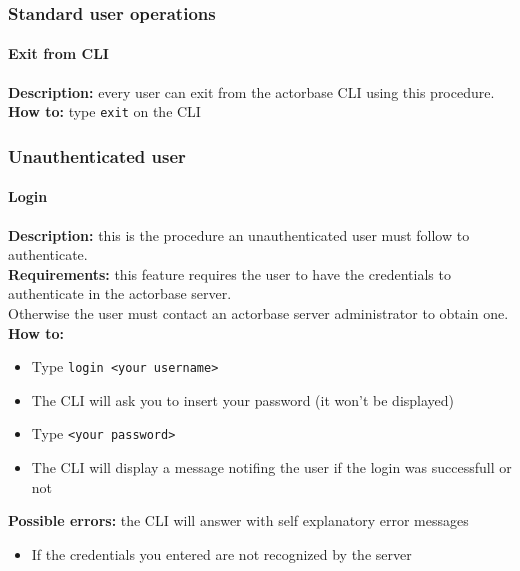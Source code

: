 \documentclass{scalatekids-article}
\begin{document}
\subsubsection{Standard user operations}
\label{sec:everyuser}
\paragraph{Exit from CLI}

\textbf{Description:} every user can exit from the actorbase CLI 
using this procedure.\\
\textbf{How to:} type \texttt{exit} on the CLI

\subsubsection{Unauthenticated user}
\label{sec:unauthenticateduser}

\paragraph{Login}

\textbf{Description:} this is the procedure an unauthenticated user must follow to authenticate.\\
\textbf{Requirements:} this feature requires the user to have the credentials 
to authenticate in the actorbase server.\\
Otherwise the user must contact an actorbase server 
administrator to obtain one.\\
\textbf{How to:} 
\begin{itemize}
	\item Type \texttt{login <your username>}
	\item The CLI will ask you to insert your password (it won't be	displayed)
	\item Type \texttt{<your password>} 
	\item The CLI will display a message notifing the user if the login was successfull or not
\end{itemize}
\textbf{Possible errors:} the CLI will answer with self explanatory error messages
\begin{itemize}
	\item If the credentials you entered are not recognized by the server
\end{itemize}
\end{document}
